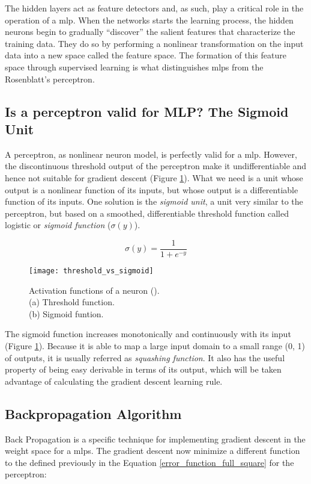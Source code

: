 The hidden layers act as feature detectors and, as such, play a critical role in the operation of a \gls{mlp}. When the networks starts the learning process, the hidden neurons begin to gradually “discover” the salient features that characterize the training data. They do so by performing a nonlinear transformation on
the input data into a new space called the feature space. The formation of this feature space through supervised learning is what distinguishes \glspl{mlp} from the Rosenblatt’s perceptron.

	\subsection{Is a perceptron valid for MLP? The Sigmoid Unit}
	A perceptron, as nonlinear neuron model, is perfectly valid for a \gls{mlp}. However, the discontinuous threshold output of the perceptron make it undifferentiable and hence not suitable for gradient descent (Figure \ref{fig:threshold_vs_sigmoid}). What we need is a unit whose output is a nonlinear function of its inputs, but whose output is a differentiable function of its inputs. One solution is the \textit{sigmoid unit}, a unit very similar to the perceptron, but based on a smoothed, differentiable threshold function called logistic or \textit{sigmoid function} ($\sigma(y)$).

		\begin{equation}
			\label{sigmoid_function}
			\sigma(y) = \frac{1}{1+e^{-y}}
		\end{equation}


	\begin{figure}[!ht]
		\centering
		\vspace{0.3cm}
		\texttt{[image: threshold\_vs\_sigmoid]}
		\caption{Activation functions of a neuron (\cite{haykin2009neural}). \\(a) Threshold function. \\(b) Sigmoid funtion.}
		\label{fig:threshold_vs_sigmoid}
	\end{figure}

	The sigmoid function increases monotonically and continuously with its input (Figure \ref{fig:threshold_vs_sigmoid}). Because it is able to map a large input domain to a small range (0, 1) of outputs, it is usually referred as \textit{squashing function}. It also has the useful property of being easy derivable in terms of its output, which will be taken advantage of calculating the gradient descent learning rule.

	\subsection{Backpropagation Algorithm}
	Back Propagation is a specific technique for implementing gradient descent in the weight space for a \glspl{mlp}. The gradient descent now minimize a different function to the defined previously in the Equation \ref{error_function_full_square} for the perceptron: 


